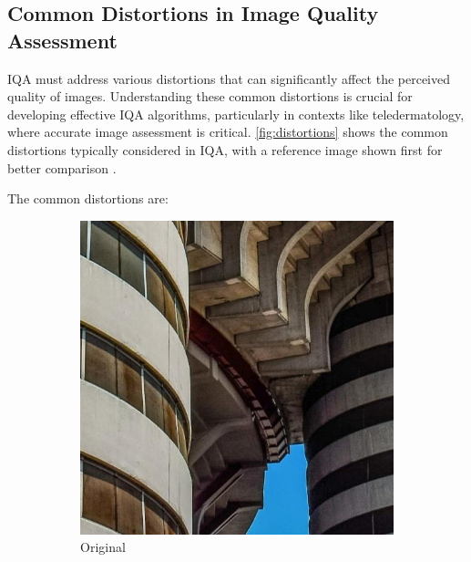 \subsection{Common Distortions in Image Quality Assessment}
\label{sub:CommonDistortionsIQA}
IQA must address various distortions that can significantly affect the perceived quality of images. Understanding these common distortions is crucial for developing effective IQA algorithms, particularly in contexts like teledermatology, where accurate image assessment is critical. \autoref{fig:distortions} shows the common distortions typically considered in IQA, with a reference image shown first for better comparison \autocite{ARNIQA}. \par
\vspace{\baselineskip}
\noindent
The common distortions are:
\begin{figure}[ht]
    \centering
    \begin{subfigure}[b]{0.24\textwidth}
        \includegraphics[width=\textwidth]{img/Original.jpg}
        \caption{Original}
    \end{subfigure}
    \hfill
    \begin{subfigure}[b]{0.24\textwidth}

\end{subfigure}
\end{figure}
